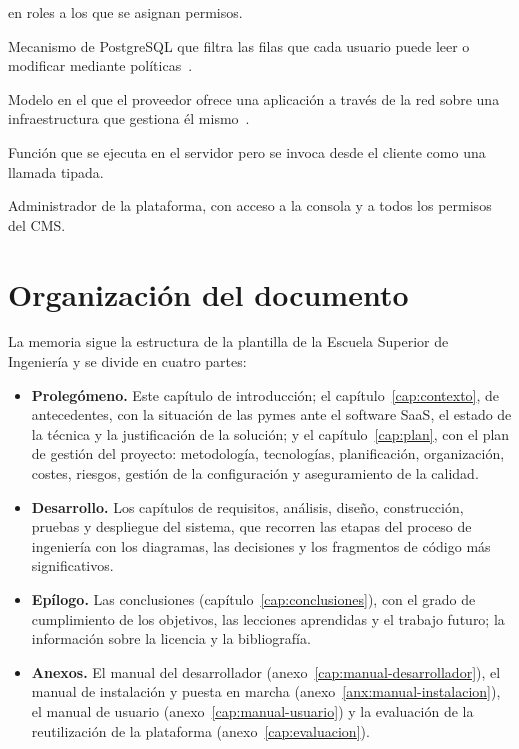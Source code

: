 \begin{description}[style=nextline,leftmargin=1.2cm]
        en roles a los que se asignan permisos.
  \item[RLS (\textit{Row Level Security})] Mecanismo de PostgreSQL que filtra
        las filas que cada usuario puede leer o modificar mediante
        políticas~\cite{postgresql-rls}.
  \item[SaaS (\textit{Software as a Service})] Modelo en el que el proveedor
        ofrece una aplicación a través de la red sobre una infraestructura
        que gestiona él mismo~\cite{nist-cloud}.
  \item[\textit{Server function}] Función que se ejecuta en el servidor pero
        se invoca desde el cliente como una llamada tipada.
  \item[Super-admin] Administrador de la plataforma, con acceso a la consola
        y a todos los permisos del CMS.
\end{description}

\section{Organización del documento}
\label{sec:intro-organizacion}

La memoria sigue la estructura de la plantilla de la Escuela Superior de
Ingeniería y se divide en cuatro partes:

\begin{itemize}
  \item \textbf{Prolegómeno.} Este capítulo de introducción; el
        capítulo~\ref{cap:contexto}, de antecedentes, con la situación de las
        pymes ante el software SaaS, el estado de la técnica y la
        justificación de la solución; y el capítulo~\ref{cap:plan}, con el
        plan de gestión del proyecto: metodología, tecnologías,
        planificación, organización, costes, riesgos, gestión de la
        configuración y aseguramiento de la calidad.
  \item \textbf{Desarrollo.} Los capítulos de requisitos, análisis, diseño,
        construcción, pruebas y despliegue del sistema, que recorren las
        etapas del proceso de ingeniería con los diagramas, las decisiones y
        los fragmentos de código más significativos.
  \item \textbf{Epílogo.} Las conclusiones (capítulo~\ref{cap:conclusiones}),
        con el grado de cumplimiento de los objetivos, las lecciones
        aprendidas y el trabajo futuro; la información sobre la licencia y la
        bibliografía.
  \item \textbf{Anexos.} El manual del desarrollador
        (anexo~\ref{cap:manual-desarrollador}), el manual de instalación y
        puesta en marcha (anexo~\ref{anx:manual-instalacion}), el manual de
        usuario (anexo~\ref{cap:manual-usuario}) y la evaluación de la
        reutilización de la plataforma (anexo~\ref{cap:evaluacion}).
\end{itemize}

